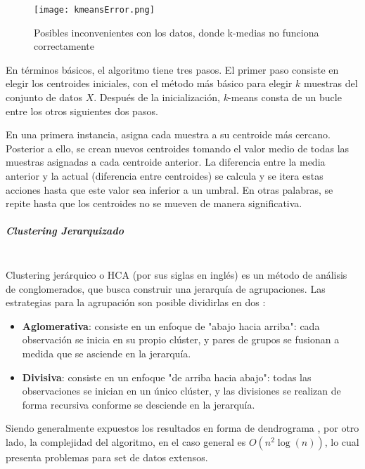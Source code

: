 \begin{figure}[!h]
	
	\centering
	\texttt{[image: kmeansError.png]}
	\caption{Posibles inconvenientes con los datos, donde k-medias  no funciona correctamente}
	\label{kerror}
\end{figure}


En términos básicos, el algoritmo tiene tres pasos. El primer paso consiste en elegir los centroides iniciales, con el método más básico para elegir $k$ muestras del conjunto de datos $X$. Después de la inicialización, \textit{k}-means  consta de un bucle entre los otros siguientes dos pasos. 

En una primera instancia, asigna cada muestra a su centroide más cercano. Posterior a ello, se crean nuevos centroides tomando el valor medio de todas las muestras asignadas a cada centroide anterior. La diferencia entre la media anterior y la actual (diferencia entre centroides) se calcula y se itera estas acciones hasta que este valor sea inferior a un umbral. En otras palabras, se repite hasta que los centroides no se mueven de manera significativa.

\subparagraph{Clustering Jerarquizado\\\\}

Clustering jerárquico o HCA (por sus siglas en inglés) es un método de análisis de conglomerados, que busca construir una jerarquía de agrupaciones. Las estrategias para la agrupación son posible dividirlas en dos \cite{johnson1967hierarchical}:

\begin{itemize}
	
	\item \textbf{Aglomerativa}: consiste en un enfoque de "abajo hacia arriba": cada observación se inicia en su propio clúster, y pares de grupos se fusionan a medida que se asciende en la jerarquía. 
	
	\item \textbf{Divisiva}: consiste en un enfoque "de arriba hacia abajo": todas las observaciones se inician en un único clúster, y las divisiones se realizan de forma recursiva conforme se desciende en la jerarquía.
	
\end{itemize}

Siendo generalmente expuestos los resultados en forma de dendrograma \cite{sokal1962comparison}, por otro lado, la complejidad del algoritmo, en el caso general es $\displaystyle O(n^{2}\log(n))$, lo cual presenta problemas para set de datos extensos.

